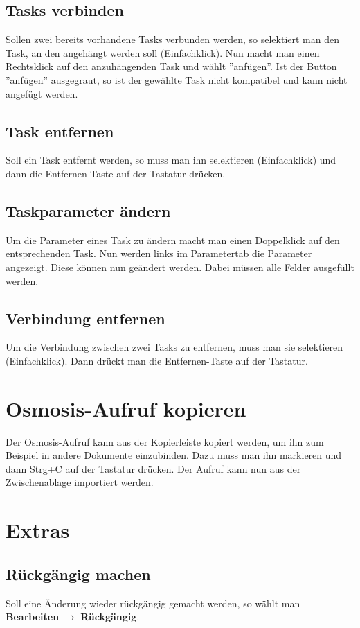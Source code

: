\documentclass[a4paper,10pt]{scrartcl}
\begin{document}
\subsection{Tasks verbinden}
Sollen zwei bereits vorhandene Tasks verbunden werden, so selektiert man den Task, an den angehängt werden soll (Einfachklick). Nun macht man einen Rechtsklick auf den anzuhängenden Task und wählt ''anfügen''. Ist der Button ''anfügen'' ausgegraut, so ist der gewählte Task nicht kompatibel und kann nicht angefügt werden. 
\subsection{Task entfernen}
Soll ein Task entfernt werden, so muss man ihn selektieren (Einfachklick) und dann die Entfernen-Taste auf der Tastatur drücken. 
\subsection{Taskparameter ändern}
Um die Parameter eines Task zu ändern macht man einen Doppelklick auf den entsprechenden Task. Nun werden links im Parametertab die Parameter angezeigt. Diese können nun geändert werden. Dabei müssen alle Felder ausgefüllt werden. 
\subsection{Verbindung entfernen}
Um die Verbindung zwischen zwei Tasks zu entfernen, muss man sie selektieren (Einfachklick). Dann drückt man die Entfernen-Taste auf der Tastatur. 

\section{Osmosis-Aufruf kopieren}
Der Osmosis-Aufruf kann aus der Kopierleiste kopiert werden, um ihn zum Beispiel in andere Dokumente einzubinden. Dazu muss man ihn markieren und dann Strg+C auf der Tastatur drücken. Der Aufruf kann nun aus der Zwischenablage importiert werden.

\section{Extras}
\subsection{Rückgängig machen}
Soll eine Änderung wieder rückgängig gemacht werden, so wählt man \textbf{Bearbeiten} $\rightarrow$ \textbf{Rückgängig}.
\end{document}

